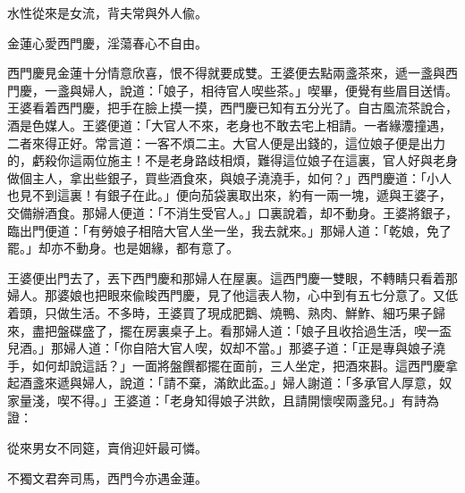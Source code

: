 \begin{myquote}
水性從來是女流，背夫常與外人偸。

金蓮心愛西門慶，淫蕩春心不自由。
\end{myquote}

西門慶見金蓮十分情意欣喜，恨不得就要成雙。王婆便去點兩盞茶來，遞一盞與西門慶，一盞與婦人，說道：「娘子，相待官人喫些茶。」喫畢，便覺有些眉目送情。王婆看着西門慶，把手在臉上摸一摸，西門慶已知有五分光了。自古風流茶說合，酒是色媒人。王婆便道：「大官人不來，老身也不敢去宅上相請。一者緣灋撞遇，二者來得正好。常言道：一客不煩二主。大官人便是出錢的，這位娘子便是出力的，虧殺你這兩位施主！不是老身路歧相煩，難得這位娘子在這裏，官人好與老身做個主人，拿出些銀子，買些酒食來，與娘子澆澆手，如何？」西門慶道：「小人也見不到這裏！有銀子在此。」便向茄袋裏取出來，約有一兩一塊，遞與王婆子，交備辦酒食。那婦人便道：「不消生受官人。」口裏說着，却不動身。王婆將銀子，臨出門便道：「有勞娘子相陪大官人坐一坐，我去就來。」那婦人道：「乾娘，免了罷。」却亦不動身。也是姻緣，都有意了。

王婆便出門去了，丟下西門慶和那婦人在屋裏。這西門慶一雙眼，不轉睛只看着那婦人。那婆娘也把眼來偸睃西門慶，見了他這表人物，心中到有五七分意了。又低着頭，只做生活。不多時，王婆買了現成肥鵝、燒鴨、熟肉、鮮鮓、細巧果子歸來，盡把盤碟盛了，擺在房裏桌子上。看那婦人道：「娘子且收拾過生活，喫一盃兒酒。」那婦人道：「你自陪大官人喫，奴却不當。」那婆子道：「正是專與娘子澆手，如何却說這話？」一面將盤饌都擺在面前，三人坐定，把酒來斟。這西門慶拿起酒盞來遞與婦人，說道：「請不棄，滿飲此盃。」婦人謝道：「多承官人厚意，奴家量淺，喫不得。」王婆道：「老身知得娘子洪飲，且請開懷喫兩盞兒。」有詩為證：

\begin{myquote}
從來男女不同筵，賣俏迎奸最可憐。

不獨文君奔司馬，西門今亦遇金蓮。
\end{myquote}

